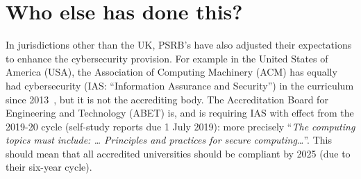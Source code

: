 \documentclass[sigconf]{acmart}
\begin{document}
\section {Who else has done this?}	
In jurisdictions other than the UK, PSRB's have also adjusted their expectations to enhance the cybersecurity provision. For example in the United States of America (USA), the Association of Computing Machinery (ACM) has equally had cybersecurity (IAS: ``Information Assurance and Security'') in the curriculum since 2013~\cite{ACM2013a}, but it is not the accrediting body. The Accreditation Board for Engineering and Technology (ABET) is, and is requiring IAS with effect from the 2019-20 cycle (self-study reports due 1 July 2019): more precisely \cite[Table 3]{Oudshoornetal2018a} ``{\emph{The computing topics must include: \dots{} Principles and practices for secure computing\dots}}''. This should mean that  all accredited universities should be compliant by 2025 (due to their six-year cycle).

\begin{comment}


Within the computer science education research community there is a growing appreciate for the need to enhance underpinning resources for example \cite{Drop2019}. Also educational cybersecurity is an increasing common theme at education research conferences.


\end{comment}

\begin{comment}

The ACM/IEEE-CS Joint Task Force on Computing Curricula~\cite[p.~97]{ACM2013a} takes a distinct view on the Knowledge Areas (KAs):

\begin{quote}
	``{\emph{The Information Assurance and Security KA is unique among the set of KAs presented here
			given the manner in which the topics are pervasive throughout other KAs.}}''
\end{quote}

It proposes nine ``core'' hours and 63.5 distributed across the other KAs. Nevertheless, the situation on the ground in the USA is different~\cite{Ackerman2019a}:

\begin{quote}
	``{\emph{Universities suffer shortcomings, as well. Roughly 85 of them offer undergraduate and/or graduate degrees in cybersecurity. There is a big catch, however. Far more diversified computer science programs, which attract substantially more students, don't mandate even one cybersecurity course.}}''
\end{quote}

\end{comment}
\end{document}
